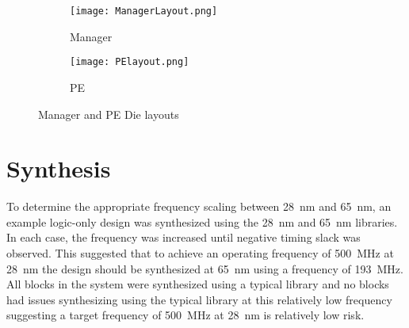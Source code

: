 \begin{figure}[h]
\centering
\begin{subfigure}{.5\textwidth}
  \centering
  \centerline{
    \mbox{\texttt{[image: ManagerLayout.png]}}
  }
  \captionsetup{justification=centering, width=.8\linewidth}
  \caption{Manager}
  \label{fig:managerLayout}
\end{subfigure}%

\bigskip

\begin{subfigure}{.5\textwidth}
  \centering
  \centerline{
    \mbox{\texttt{[image: PElayout.png]}}
  }
  \captionsetup{justification=centering, width=.8\linewidth}
  \caption{PE}
  \label{fig:peLayout}
\end{subfigure}
\captionsetup{justification=centering, width=.9\linewidth}
\caption{Manager and PE Die layouts}
\label{fig:Manager and PE Die layouts}
\end{figure}



\section{Synthesis}
\label{sec:Synthesis}

To determine the appropriate frequency scaling between \SI{28}{\nano\meter} and \SI{65}{\nano\meter}, an example logic-only design was synthesized using the \SI{28}{\nano\meter} and \SI{65}{\nano\meter} libraries. 
In each case, the frequency was increased until negative timing slack was observed.
This suggested that to achieve an operating frequency of \SI{500}{\mega\hertz} at \SI{28}{\nano\meter} the design should be synthesized at \SI{65}{\nano\meter} using a frequency of \SI{193}{\mega\hertz}.
All blocks in the system were synthesized using a typical library and no blocks had issues synthesizing using the typical library at this relatively low frequency suggesting a target frequency of \SI{500}{\mega\hertz} at \SI{28}{\nano\meter} is relatively low risk.


\iffalse
As mention previously \eqref{eq:averageBandwidth}, to process multiple useful sized \acp{ann} requires a sustained bandwidth to the \ac{pe} of the order of ten's of \SI[per-mode=symbol]{}{\tera\bit\per\second}.
\fi

